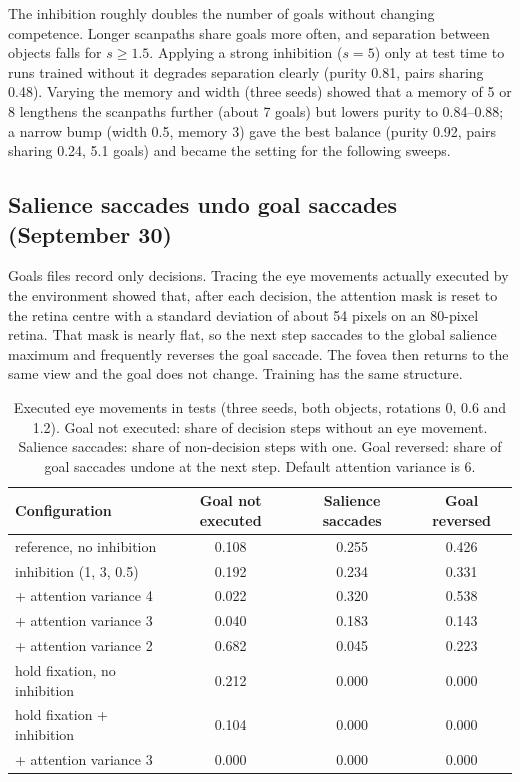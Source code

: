 \documentclass[11pt,a4paper]{article}
\begin{document}
The inhibition roughly doubles the number of goals without changing competence.
Longer scanpaths share goals more often, and separation between objects falls
for $s\ge1.5$. Applying a strong inhibition ($s=5$) only at test time to runs
trained without it degrades separation clearly (purity 0.81, pairs sharing
0.48). Varying the memory and width (three seeds) showed that a memory of 5 or
8 lengthens the scanpaths further (about 7 goals) but lowers purity to
0.84--0.88; a narrow bump (width 0.5, memory 3) gave the best balance
(purity 0.92, pairs sharing 0.24, 5.1 goals) and became the setting for the
following sweeps.

\subsection{Salience saccades undo goal saccades (September 30)}

Goals files record only decisions. Tracing the eye movements actually executed
by the environment showed that, after each decision, the attention mask is reset
to the retina centre with a standard deviation of about 54 pixels on an
80-pixel retina. That mask is nearly flat, so the next step saccades to the
global salience maximum and frequently reverses the goal saccade. The fovea
then returns to the same view and the goal does not change. Training has the
same structure.

\begin{table}[h]
\centering
\begin{tabular}{@{}lccc@{}}
\toprule
Configuration & Goal not executed & Salience saccades & Goal reversed \\
\midrule
reference, no inhibition          & 0.108 & 0.255 & 0.426 \\
inhibition (1, 3, 0.5)            & 0.192 & 0.234 & 0.331 \\
\quad + attention variance 4      & 0.022 & 0.320 & 0.538 \\
\quad + attention variance 3      & 0.040 & 0.183 & 0.143 \\
\quad + attention variance 2      & 0.682 & 0.045 & 0.223 \\
hold fixation, no inhibition      & 0.212 & 0.000 & 0.000 \\
hold fixation + inhibition        & 0.104 & 0.000 & 0.000 \\
\quad + attention variance 3      & 0.000 & 0.000 & 0.000 \\
\bottomrule
\end{tabular}
\caption{Executed eye movements in tests (three seeds, both objects, rotations
0, 0.6 and 1.2). Goal not executed: share of decision steps without an eye
movement. Salience saccades: share of non-decision steps with one. Goal
reversed: share of goal saccades undone at the next step. Default attention
variance is 6.}
\label{tab:trace}
\end{table}
\end{document}
